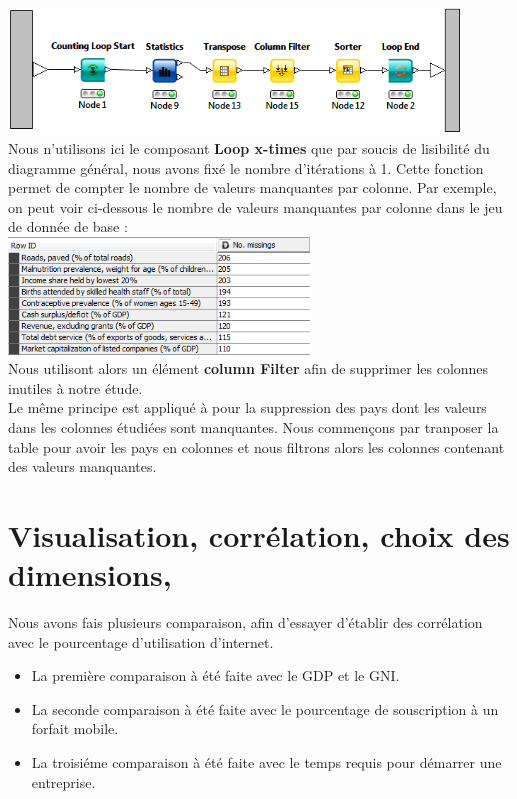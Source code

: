 	\includegraphics[width=0.9\textwidth]{Loop.png}\\
	Nous n'utilisons ici le composant \textbf{Loop x-times} que par soucis de lisibilité du diagramme général, nous avons fixé le nombre d'itérations à 1.
	Cette fonction permet de compter le nombre de valeurs manquantes par colonne. Par exemple, on peut voir ci-dessous le nombre de valeurs manquantes par colonne dans le jeu de donnée de base : \\
	\includegraphics[width=0.6\textwidth]{ColumnMissing.png}\\
	Nous utilisont alors un élément \textbf{column Filter} afin de supprimer les colonnes inutiles à notre étude.\\
	Le même principe est appliqué à pour la suppression des pays dont les valeurs dans les colonnes étudiées sont manquantes. Nous commençons par tranposer la table pour avoir les pays en colonnes et nous filtrons alors les colonnes contenant des valeurs manquantes.
		
		
\section{Visualisation, corrélation, choix des dimensions, }

    Nous avons fais plusieurs comparaison, afin d'essayer d'établir des corrélation avec le pourcentage d'utilisation d'internet.
    \begin{itemize}
        \item La première comparaison à été faite avec le GDP et le GNI.
        \item La seconde comparaison à été faite avec le pourcentage de souscription à un forfait mobile.
        \item La troisiéme comparaison à été faite avec le temps requis pour démarrer une entreprise.
    \end{itemize}


